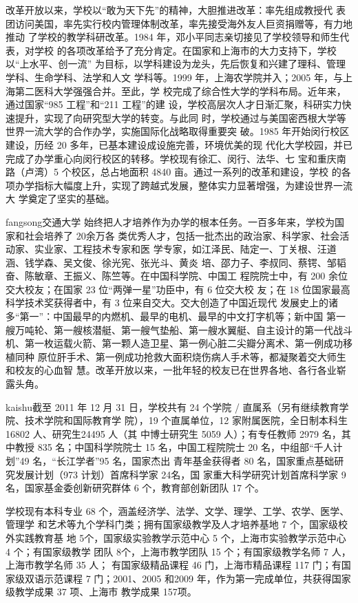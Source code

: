 \documentclass{sjtureport}
\begin{document}
{\heiti 改革开放以来，学校以“敢为天下先”的精神，大胆推进改革：率先组成教授代
表团访问美国，率先实行校内管理体制改革，率先接受海外友人巨资捐赠等，有力地推动
了学校的教学科研改革。1984 年，邓小平同志亲切接见了学校领导和师生代表，对学校
的各项改革给予了充分肯定。在国家和上海市的大力支持下，学校以“上水平、创一流”
为目标，以学科建设为龙头，先后恢复和兴建了理科、管理学科、生命学科、法学和人文
学科等。1999 年，上海农学院并入；2005 年，与上海第二医科大学强强合并。至此，学
校完成了综合性大学的学科布局。近年来，通过国家“985 工程”和“211 工程”的建
设，学校高层次人才日渐汇聚，科研实力快速提升，实现了向研究型大学的转变。与此同
时，学校通过与美国密西根大学等世界一流大学的合作办学，实施国际化战略取得重要突
破。1985 年开始闵行校区建设，历经 20 多年，已基本建设成设施完善，环境优美的现
代化大学校园，并已完成了办学重心向闵行校区的转移。学校现有徐汇、闵行、法华、七
宝和重庆南路（卢湾）5 个校区，总占地面积 4840 亩。通过一系列的改革和建设，学校
的各项办学指标大幅度上升，实现了跨越式发展，整体实力显著增强，为建设世界一流大
学奠定了坚实的基础。}

{\ifcsname fangsong\endcsname\fangsong\else[无 \cs{fangsong} 字体。]\fi 交通大学
始终把人才培养作为办学的根本任务。一百多年来，学校为国家和社会培养了 20余万各
类优秀人才，包括一批杰出的政治家、科学家、社会活动家、实业家、工程技术专家和医
学专家，如江泽民、陆定一、丁关根、汪道涵、钱学森、吴文俊、徐光宪、张光斗、黄炎
培、邵力子、李叔同、蔡锷、邹韬奋、陈敏章、王振义、陈竺等。在中国科学院、中国工
程院院士中，有 200 余位交大校友；在国家 23 位“两弹一星”功臣中，有 6 位交大校
友；在 18 位国家最高科学技术奖获得者中，有 3 位来自交大。交大创造了中国近现代
发展史上的诸多“第一”：中国最早的内燃机、最早的电机、最早的中文打字机等；新中国
第一艘万吨轮、第一艘核潜艇、第一艘气垫船、第一艘水翼艇、自主设计的第一代战斗
机、第一枚运载火箭、第一颗人造卫星、第一例心脏二尖瓣分离术、第一例成功移植同种
原位肝手术、第一例成功抢救大面积烧伤病人手术等，都凝聚着交大师生和校友的心血智
慧。改革开放以来，一批年轻的校友已在世界各地、各行各业崭露头角。}

{\ifcsname kaishu\endcsname\kaishu\else[无 \cs{kaishu} 字体。]\fi 截至 2011 年 12
月 31 日，学校共有 24 个学院 / 直属系（另有继续教育学院、技术学院和国际教育学
院），19 个直属单位，12 家附属医院，全日制本科生 16802 人、研究生24495 人（其
中博士研究生 5059 人）；有专任教师 2979 名，其中教授 835 名；中国科学院院士 15
名，中国工程院院士 20 名，中组部“千人计划”49 名，“长江学者”95 名，国家杰出
青年基金获得者 80 名，国家重点基础研究发展计划（973 计划）首席科学家 24名，国
家重大科学研究计划首席科学家 9名，国家基金委创新研究群体 6 个，教育部创新团队
17 个。

学校现有本科专业 68 个，涵盖经济学、法学、文学、理学、工学、农学、医学、管理学
和艺术等九个学科门类；拥有国家级教学及人才培养基地 7 个，国家级校外实践教育基
地 5个，国家级实验教学示范中心 5 个，上海市实验教学示范中心 4 个；有国家级教学
团队 8个，上海市教学团队 15 个；有国家级教学名师 7 人，上海市教学名师 35 人；
有国家级精品课程 46 门，上海市精品课程 117 门；有国家级双语示范课程 7
门；2001、2005 和2009 年，作为第一完成单位，共获得国家级教学成果 37 项、上海市
教学成果 157项。}
\end{document}
